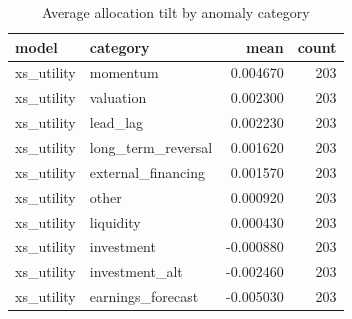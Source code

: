 \begin{table}
\caption{Average allocation tilt by anomaly category}
\label{tab:t9_tilt_by_category}
\begin{tabular}{llrr}
\toprule
model & category & mean & count \\
\midrule
xs\_utility & momentum & 0.004670 & 203 \\
xs\_utility & valuation & 0.002300 & 203 \\
xs\_utility & lead\_lag & 0.002230 & 203 \\
xs\_utility & long\_term\_reversal & 0.001620 & 203 \\
xs\_utility & external\_financing & 0.001570 & 203 \\
xs\_utility & other & 0.000920 & 203 \\
xs\_utility & liquidity & 0.000430 & 203 \\
xs\_utility & investment & -0.000880 & 203 \\
xs\_utility & investment\_alt & -0.002460 & 203 \\
xs\_utility & earnings\_forecast & -0.005030 & 203 \\
\bottomrule
\end{tabular}
\end{table}
